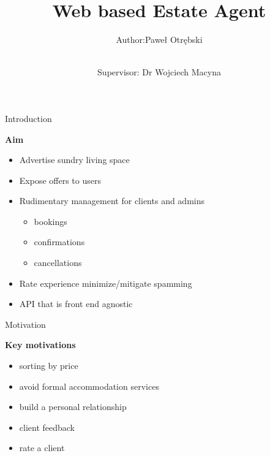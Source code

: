 \documentclass[11pt]{beamer}
\author{
	Author:Paweł Otrębski \and \\
	 Supervisor: Dr Wojciech Macyna
}
\title{Web based Estate Agent}
\institute{Wroclaw University of Technology}
\date{}
\begin{document}
\begin{frame}{}
\titlepage
\end{frame}

\begin{frame}
\tableofcontents
\end{frame}

\begin{frame}{Introduction}
\begin{flushleft}
\textbf{Aim}\\
\pause
\begin{itemize}
	\item Advertise sundry living space
	\pause
	\item Expose offers to users
	\pause
	\item Rudimentary management for clients and admins 
	\pause
	\begin{itemize}
		\item bookings 
		\item confirmations
		\item cancellations
	\end{itemize}
	\pause
	\item Rate experience minimize/mitigate spamming
	\pause
	\item API that is front end agnostic
\end{itemize}
\end{flushleft}
\end{frame}

\begin{frame}{Motivation}
	\begin{flushleft}
	\textbf{Key motivations}
	\begin{itemize}
		\item sorting by price %
		\item avoid formal accommodation services
		\item build a personal relationship
		\item client feedback
		\item rate a client
	\end{itemize}
	\end{flushleft}
\end{frame}
\end{document}
